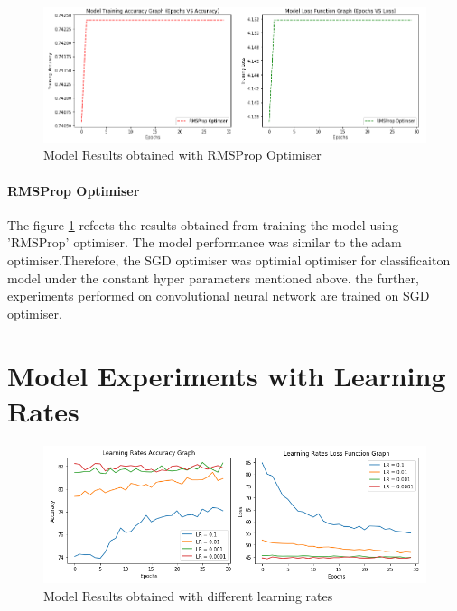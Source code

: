 \begin{figure}[!htp]
    \centering
    \includegraphics[width=15cm]{Images/rmsprop.png}
    \caption{Model Results obtained with RMSProp Optimiser}
    \label{fig:rms}
\end{figure}

\paragraph{RMSProp Optimiser}
The figure \ref{fig:rms} refects the results obtained from training the model using 'RMSProp' optimiser. The model performance was similar to 
the adam optimiser.Therefore, the SGD optimiser was optimial optimiser for classificaiton model under the constant hyper parameters mentioned above.
the further, experiments performed on convolutional neural network are trained on SGD optimiser.

\section{Model Experiments with Learning Rates}

\begin{figure}[!htp]
    \centering
    \includegraphics[width=15cm]{Images/lr.png}
    \caption{Model Results obtained with different learning rates}
    \label{fig:lrates}
\end{figure}


